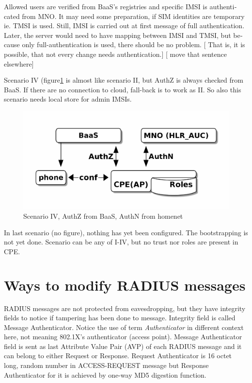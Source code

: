 \documentclass[12pt,a4paper,english]{tutthesis}
\begin{document}
\begin{otherlanguage}{english}
Allowed users are verified from BaaS's registries and specific IMSI is
authenticated from MNO.  It may need some preparation, if SIM
identities are temporary ie. TMSI is used.  Still, IMSI is carried out at first message
of full authentication. Later, the server would need to have mapping
between IMSI and TMSI, but because only full-authentication is used,
there should be no problem.
[ That is, it is possible, that not every change needs
authentication.]
[ move that sentence elsewhere]


\label{scenario-iv} 


Scenario IV (figure\ref{fig:scenario-IV} is almost like scenario II, but
AuthZ is always checked from BaaS. If there are no connection to
cloud, fall-back is to work as II. So also this scenario needs local
store for admin IMSIs.

\begin{figure}[htb]
\centering
\includegraphics[width=.9\linewidth]{scenIV.png}
\caption{\label{fig:scenario-IV}Scenario IV, AuthZ from BaaS, AuthN from homenet}
\end{figure}

In last scenario (no figure), nothing has yet been configured. The bootstrapping
is not yet done. Scenario can be any of I-IV, but 
no trust nor roles are present in CPE.
\section{Ways to modify RADIUS messages}
\label{sec-4-6}
RADIUS messages are not protected from eavesdropping, but they have
integrity fields to notice if tampering has been done to message.  
Integrity field is called Message Authenticator.
Notice the use of term \emph{Authenticator} in different context here, not
meaning 802.1X's authenticator (access point).
Message Authenticator field is sent as last Attribute Value Pair (AVP)
of each RADIUS message and it can belong 
to either Request or Response.\cite[p.20]{radiusbook}
Request Authenticator is 16 octet long, random number in
ACCESS-REQUEST message but Response Authenticator for it is achieved
by one-way MD5 digestion function. 


\end{otherlanguage}
\end{document}
